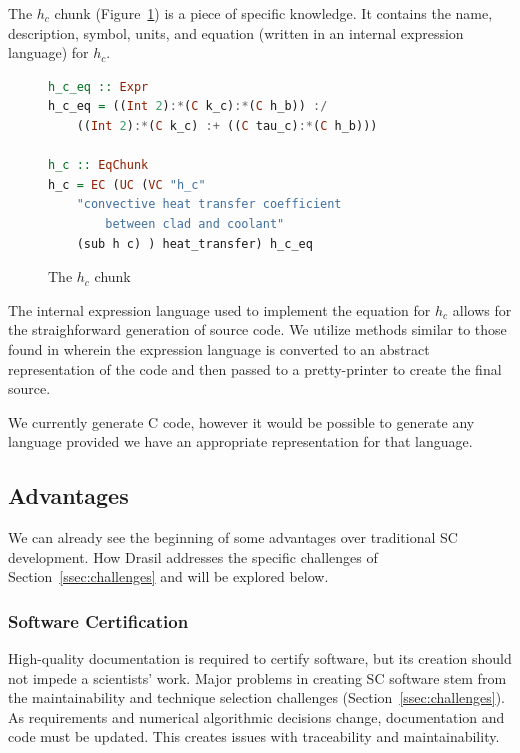 \documentclass{sig-alternate-05-2015}
\newcommand{\lss}{Drasil}
\begin{document}
The $h_c$ chunk (Figure~\ref{fig:know_specific}) is a piece of specific
knowledge. It contains the name, description, symbol, units, and equation
(written in an internal expression language) for $h_c$.

\begin{figure}
\begin{lstlisting}[language=Haskell, frame=single, showstringspaces=false, basicstyle=\small]
h_c_eq :: Expr
h_c_eq = ((Int 2):*(C k_c):*(C h_b)) :/ 
    ((Int 2):*(C k_c) :+ ((C tau_c):*(C h_b)))

h_c :: EqChunk
h_c = EC (UC (VC "h_c" 
    "convective heat transfer coefficient 
        between clad and coolant"
    (sub h c) ) heat_transfer) h_c_eq
\end{lstlisting}
\caption{The $h_c$ chunk}
\label{fig:know_specific}
\end{figure}

The internal expression language used to implement the equation for $h_c$
allows for the straighforward generation of source code. We utilize methods
similar to those found in \cite{SAGA:DSL, Szymczak2014}
wherein the expression language is converted to an abstract representation of
the code and then passed to a pretty-printer to create the final source.

We currently generate C code, however it would be possible to generate any
language provided we have an appropriate representation for that language.

\subsection{Advantages} \label{ssec:advantages}

We can already see the beginning of some advantages over traditional SC
development. How \lss{} addresses the specific challenges of
Section~\ref{ssec:challenges} and will be explored below.

\subsubsection{Software Certification} \label{sssec:adv_cert}

High-quality documentation is required to certify software, but its creation
should not impede a scientists' work.  Major problems in creating SC software
stem from the maintainability and technique selection challenges
(Section~\ref{ssec:challenges}). As requirements and numerical algorithmic
decisions change, documentation and code must be updated.  This creates issues
with traceability and maintainability.
\end{document}
